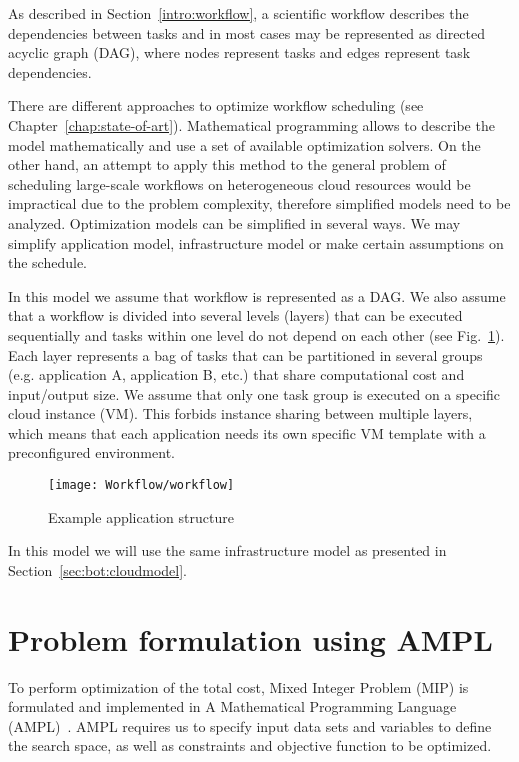 {    As described in Section \ref{intro:workflow}, a scientific workflow describes the dependencies between tasks and in most cases may be represented as directed acyclic graph (DAG), where nodes represent tasks and edges represent task dependencies. 
    
    There are different approaches to optimize workflow scheduling (see Chapter \ref{chap:state-of-art}). Mathematical programming allows to describe the model mathematically and use a set of available optimization solvers. On the other hand, an attempt to apply this method to the general problem of scheduling large-scale workflows on heterogeneous cloud resources would be impractical due to the problem complexity, therefore simplified models need to be analyzed. Optimization models can be simplified in several ways. We may simplify application model, infrastructure model or make certain assumptions on the schedule.
    
    In this model we assume that workflow is represented as a DAG. We also assume that a workflow is divided into several levels (layers) that can be executed sequentially and tasks within one level do not depend on each other (see Fig.~\ref{fig:workflow:appmodel}). Each layer represents a bag of tasks that can be partitioned in several groups (e.g. application A, application B, etc.) that share computational cost and input/output size. We assume that only one task group is executed on a specific cloud instance (VM). This forbids instance sharing between multiple layers, which means that each application needs its own specific VM template with a preconfigured environment.

    \begin{figure}[tb]
        \centering \texttt{[image: Workflow/workflow]}
        \caption{Example application structure}
        \label{fig:workflow:appmodel}
    \end{figure}
    
    In this model we will use the same infrastructure model as presented in Section~\ref{sec:bot:cloudmodel}.
  
    \section{Problem formulation using AMPL}
    \label{sec:workflow:problem}
  
    To perform optimization of the total cost, Mixed Integer Problem (MIP) is formulated and implemented in A Mathematical Programming Language (AMPL)~\cite{Fourer2002}.  AMPL requires us to specify input data sets and variables to define the search space, as well as constraints and objective function to be optimized.
    
}
